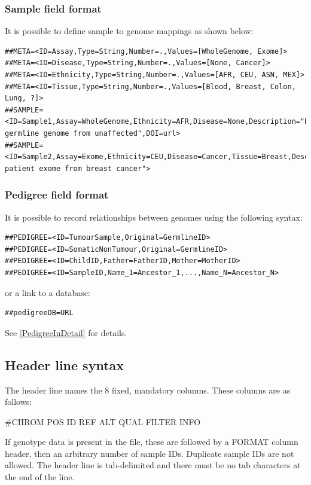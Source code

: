 \documentclass[8pt]{article}
\begin{document}
\subsubsection{Sample field format}
It is possible to define sample to genome mappings as shown below:
{\scriptsize
\begin{verbatim}
##META=<ID=Assay,Type=String,Number=.,Values=[WholeGenome, Exome]>
##META=<ID=Disease,Type=String,Number=.,Values=[None, Cancer]>
##META=<ID=Ethnicity,Type=String,Number=.,Values=[AFR, CEU, ASN, MEX]>
##META=<ID=Tissue,Type=String,Number=.,Values=[Blood, Breast, Colon, Lung, ?]>
##SAMPLE=<ID=Sample1,Assay=WholeGenome,Ethnicity=AFR,Disease=None,Description="Patient germline genome from unaffected",DOI=url>
##SAMPLE=<ID=Sample2,Assay=Exome,Ethnicity=CEU,Disease=Cancer,Tissue=Breast,Description="European patient exome from breast cancer">
\end{verbatim}}

\subsubsection{Pedigree field format}
It is possible to record relationships between genomes using the following syntax:
\begin{verbatim}
##PEDIGREE=<ID=TumourSample,Original=GermlineID>
##PEDIGREE=<ID=SomaticNonTumour,Original=GermlineID>
##PEDIGREE=<ID=ChildID,Father=FatherID,Mother=MotherID>
##PEDIGREE=<ID=SampleID,Name_1=Ancestor_1,...,Name_N=Ancestor_N>
\end{verbatim}
\noindent or a link to a database:
\begin{verbatim}
##pedigreeDB=URL
\end{verbatim}

\noindent See \ref{PedigreeInDetail} for details.


\subsection{Header line syntax}
\label{header-line}
The header line names the 8 fixed, mandatory columns. These columns are as follows:
\begin{center}
       \#CHROM
\qquad POS
\qquad ID
\qquad REF
\qquad ALT
\qquad QUAL
\qquad FILTER
\qquad INFO
\end{center}
\noindent
If genotype data is present in the file, these are followed by a FORMAT column header, then an arbitrary number of sample IDs.
Duplicate sample IDs are not allowed.
The header line is tab-delimited and there must be no tab characters at the end of the line.
\end{document}
